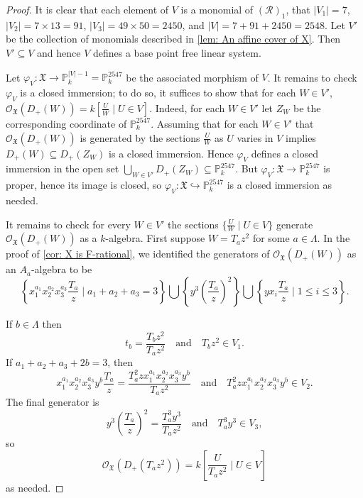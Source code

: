 \documentclass[10pt,a4paper]{amsart}
\newcommand{\PP}{\mathbb{P}}
\newcommand{\cO}{\mathcal{O}}
\begin{document}
\begin{proof}
    It is clear that each element of $V$ is a monomial of $\left(\mathcal{R}\right)_1$, that $|V_1|=7$, $|V_2| = 7\times13=91$, $|V_3| = 49\times50 = 2450$, and $|V| = 7+91+2450 = 2548$. Let $V'$ be the collection of monomials described in \cref{lem: An affine cover of X}. Then $V'\subseteq V$ and hence $V$ defines a base point free linear system. 

    Let $\varphi_V:\mathfrak{X}\to \PP^{|V|-1}_k = \PP^{2547}_k$ be the associated morphism of $V$. It remains to check $\varphi_V$ is a closed immersion; to do so, it suffices to show that for each $W\in V'$, $\mathcal{O}_\mathfrak{X}(D_+(W)) = k\left[\frac{U}{W}\mid U\in V\right]$. Indeed, for each $W\in V'$ let $Z_W$ be the corresponding coordinate of $\PP^{2547}_k$. Assuming that for each $W\in V'$ that $\mathcal{O}_\mathfrak{X}(D_+(W))$ is generated by the sections $\frac{U}{W}$ as $U$ varies in $V$ implies $D_+(W)\subseteq D_+(Z_W)$ is a closed immersion. Hence $\varphi_V$ defines a closed immersion in the open set $\bigcup_{W\in V'}D_+(Z_W)\subseteq \PP^{2547}_k$. But $\varphi_V:\mathfrak{X}\to \PP^{2547}_k$ is proper, hence its image is closed, so $\varphi_V:\mathfrak{X}\hookrightarrow \PP^{2547}_k$ is a closed immersion as needed.

    It remains to check for every $W\in V'$ the sections $\{\frac{U}{W}\mid U\in V\}$ generate $\cO_{\mathfrak{X}}(D_+(W))$ as a $k$-algebra. First suppose $W = T_az^2$ for some $a\in\Lambda$. In the proof of \cref{cor: X is F-rational}, we identified the generators of $\cO_{\mathfrak{X}}(D_+(W))$ as an $A_a$-algebra to be 
    \[
    \left\{x_1^{a_1}x_2^{a_2}x_3^{a_3}\frac{T_a}{z}\mid a_1+a_2+a_3 = 3\right\} \bigcup \left\{y^3\left(\frac{T_a}{z}\right)^2\right\}\bigcup\left\{yx_i\frac{T_a}{z}\mid 1\leq i\leq 3\right\}.
    \]
    
    If $b\in\Lambda$ then
    \[
    t_b = \frac{T_bz^2}{T_az^2}\quad \mbox{and}\quad T_bz^2\in V_1.
    \]
    If $a_1+a_2+a_3 +2b = 3$, then 
    \[
    x_1^{a_1}x_2^{a_2}x_3^{a_3}y^b\frac{T_a}{z} = \frac{T_a^2zx_1^{a_1}x_2^{a_2}x_3^{a_3}y^b}{T_az^2} \quad \mbox{and}\quad T_a^2zx_1^{a_1}x_2^{a_2}x_3^{a_3}y^b\in V_2.
    \]
    The final generator is
    \[
    y^3\left(\frac{T_a}{z}\right)^2=\frac{T_a^3y^3}{T_az^2}\quad\mbox{and}\quad T_a^3y^3\in V_3,
    \]
    so
    \[
    \cO_\mathfrak{X}(D_+(T_az^2)) = k\left[\frac{U}{T_az^2}\mid U\in V\right]
    \]
    as needed.


\end{proof}
\end{document}
